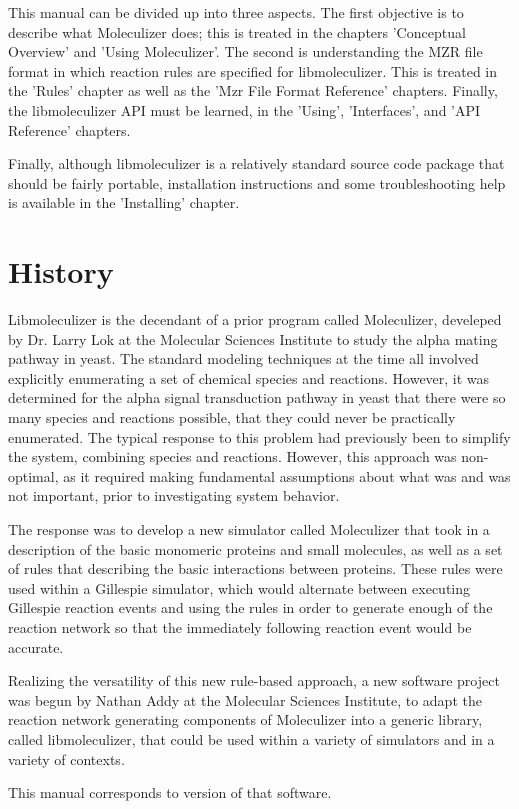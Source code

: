 This manual can be divided up into three aspects.  The first objective
is to describe what Moleculizer does; this is treated in the chapters
'Conceptual Overview' and 'Using Moleculizer'.  The second is understanding the
MZR file format in which reaction rules are specified for
libmoleculizer.  This is treated in the 'Rules' chapter as well as the
'Mzr File Format Reference' chapters.  Finally, the libmoleculizer API
must be learned, in the 'Using', 'Interfaces', and 'API Reference'
chapters.

Finally, although libmoleculizer is a relatively standard source code
package that should be fairly portable, installation instructions and
some troubleshooting help is available in the 'Installing' chapter.

\section{History}
Libmoleculizer is the decendant of a prior program called Moleculizer,
develeped by Dr. Larry Lok at the Molecular Sciences Institute to
study the alpha mating pathway in yeast. The standard modeling
techniques at the time all involved explicitly enumerating a set of
chemical species and reactions. However, it was determined for the
alpha signal transduction pathway in yeast that there were so many
species and reactions possible, that they could never be practically
enumerated. The typical response to this problem had previously been
to simplify the system, combining species and reactions. However,
this approach was non-optimal, as it required making fundamental
assumptions about what was and was not important, prior to
investigating system behavior. 

The response was to develop a new simulator called Moleculizer that
took in a description of the basic monomeric proteins and small
molecules, as well as a set of rules that describing the basic
interactions between proteins. These rules were used within a
Gillespie simulator, which would alternate between executing Gillespie
reaction events and using the rules in order to generate enough of the
reaction network so that the immediately following reaction event
would be accurate.  

Realizing the versatility of this new rule-based approach, a new
software project was begun by Nathan Addy at the Molecular Sciences
Institute, to adapt the reaction network generating components of
Moleculizer into a generic library, called libmoleculizer, that could
be used within a variety of simulators and in a variety of contexts.

This manual corresponds to version \currentversion of that software.